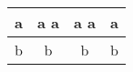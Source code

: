 \documentclass{article}
\begin{document}
    \begin{tabular}{| c | c | c | c |}
	    \hline
	    a & a a & a a & a \\ \hline
	    b & b & b & b \\ \hline
    \end{tabular}
\end{document}
